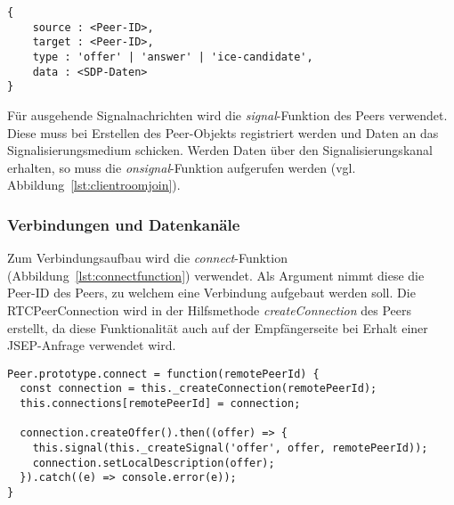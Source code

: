 \vspace{5pt}
\lstset{language=js, style=STYLE_CODE_JS}
\begin{singlespace}
\begin{minipage}{\textwidth}
\begin{lstlisting}[caption={Format des Signalisierungsprotokolls}, captionpos=b, label={lst:protocoll}]
{
    source : <Peer-ID>,
    target : <Peer-ID>,
    type : 'offer' | 'answer' | 'ice-candidate',
    data : <SDP-Daten>
}
\end{lstlisting}
\end{minipage}
\end{singlespace}

Für ausgehende Signalnachrichten wird die \textit{signal}-Funktion des Peers verwendet. Diese muss bei Erstellen des Peer-Objekts registriert werden und Daten an das Signalisierungsmedium schicken. Werden Daten über den Signalisierungskanal erhalten, so muss die \textit{onsignal}-Funktion aufgerufen werden (vgl. Abbildung~\ref{lst:clientroomjoin}).

\subsubsection{Verbindungen und Datenkanäle}
Zum Verbindungsaufbau wird die \textit{connect}-Funktion (Abbildung~\ref{lst:connectfunction}) verwendet. Als Argument nimmt diese die Peer-ID des Peers, zu welchem eine Verbindung aufgebaut werden soll. Die RTCPeerConnection wird in der Hilfsmethode \textit{createConnection} des Peers erstellt, da diese Funktionalität auch auf der Empfängerseite bei Erhalt einer \acs{JSEP}-Anfrage verwendet wird.\par

\lstset{language=js, style=STYLE_CODE_JS}
\begin{minipage}{\textwidth}
\begin{singlespace}
\begin{lstlisting}[caption={\textit{connect}-Funktion -- peer.js}, captionpos=b, label={lst:connectfunction}]
Peer.prototype.connect = function(remotePeerId) {
  const connection = this._createConnection(remotePeerId);
  this.connections[remotePeerId] = connection;

  connection.createOffer().then((offer) => {
    this.signal(this._createSignal('offer', offer, remotePeerId));
    connection.setLocalDescription(offer);
  }).catch((e) => console.error(e));
}
\end{lstlisting}
\end{singlespace}
\end{minipage}

